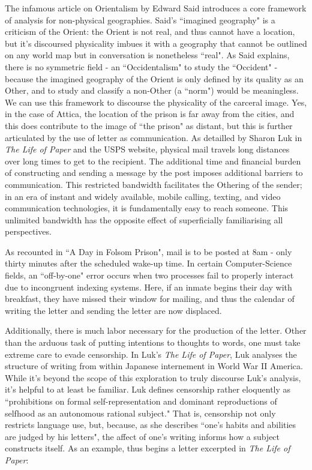 \documentclass[14pt, letterpaper]{report}
\begin{document}
    The infamous article on Orientalism by Edward Said \autocite{said-orientalism} 
    introduces a core framework of analysis for non-physical geographies. Said's 
    ``imagined geography" is a criticism of the Orient: the Orient is not real, 
    and thus cannot have a location, but it's discoursed physicality imbues it with 
    a geography that cannot be outlined on any world map but in conversation is 
    nonetheless ``real". As Said explains, there is no symmetric field - an ``Occidentalism" 
    to study the ``Occident" - because the imagined geography of the Orient is only 
    defined by its quality as an Other, and to study and classify a non-Other (a ``norm") 
    would be meaningless. \autocite[163]{said-orientalism} We can use this framework to 
    discourse the physicality of the carceral image. Yes, in the case of Attica, the 
    location of the prison is far away from the cities, and this does contribute to 
    the image of ``the prison" as distant, but this is further articulated by the 
    use of letter as communication. As detailled by Sharon Luk in \textit{The Life 
    of Paper} and the USPS website, physical mail travels long distances over long 
    times to get to the recipient. The additional time and financial burden of 
    constructing and sending a message by the post imposes additional barriers to 
    communication. This restricted bandwidth facilitates the Othering of the sender; 
    in an era of instant and widely available, mobile calling, texting, and video 
    communication technologies, it is fundamentally easy to reach someone. This 
    unlimited bandwidth has the opposite effect of superficially familiarising all 
    perspectives. 
    
    As recounted in ``A Day in Folsom Prison", mail is to be posted at 8am - only 
    thirty minutes after the scheduled wake-up time.\autocite[64]{soul-on-ice}
     In certain Computer-Science 
    fields, an ``off-by-one" error occurs when two processes fail to properly 
    interact due to incongruent indexing systems. Here, if an inmate begins their
    day with breakfast, they have missed their window for mailing, and thus the 
    calendar of writing the letter and sending the letter are now displaced. 
    
    Additionally, there is much labor necessary for the production of the 
    letter. Other than the arduous task of putting intentions to thoughts 
    to words, one must take extreme care to evade censorship. In Luk's 
    \textit{The Life of Paper}, Luk analyses the structure of writing 
    from within Japanese internement in World War II America. While 
    it's beyond the scope of this exploration to truly discourse Luk's 
    analysis, it's helpful to at least be familiar. Luk defines censorship
    rather 
    eloquently as ``prohibitions on formal self-representation and
    dominant reproductions of selfhood as an autonomous rational 
    subject."\autocite[121]{life-of-paper} That is, censorship 
    not only restricts language use, but, because, as she describes 
    ``one's habits and abilities are judged by his letters", the 
    affect of one's writing informs how a subject constructs 
    itself.\autocite[2]{life-of-paper} As an example, thus begins 
    a letter excerpted in \textit{The Life of Paper}:
    
\end{document}
